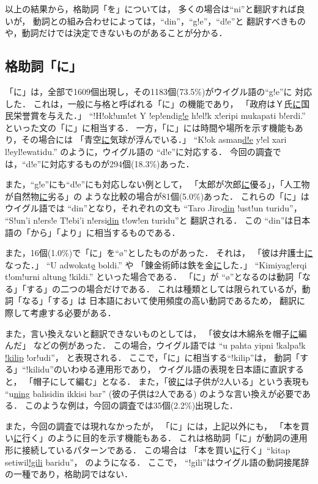 以上の結果から，格助詞「を」については，
多くの場合は``ni''と翻訳すれば良いが，
動詞との組み合わせによっては，``din''，``g!e''，``d!e''と
翻訳すべきものや，動詞だけでは決定できないものがあることが分かる．

\subsection{格助詞「に」}
\label{sec:ni}
「に」は，全部で1609個出現し，その1183個(73.5\%)がウイグル語の``g!e''に
対応した．
これは，一般に与格と呼ばれる「に」の機能であり，
「政府はＹ氏\underline{に}国民栄誉賞を与えた．」
``!H!ok!um!et Y !ep!endi\underline{g!e} h!el!k x!eripi mukapati b!erdi.''
といった文の「に」に相当する．
一方，「に」には時間や場所を示す機能もあり，その場合には
「青空\underline{に}気球が浮んでいる．」
``K!ok asman\underline{d!e} y!el xari l!eyl!ewatidu.''
のように，ウイグル語の ``d!e''に対応する．
今回の調査では，``d!e''に対応するものが294個(18.3\%)あった．

また，``g!e''にも``d!e''にも対応しない例として，
「太郎が次郎\underline{に}優る」，「人工物が自然物\underline{に}劣る」の
ような比較の場合が81個(5.0\%)あった．
これらの「に」はウイグル語では ``din''となり，それぞれの文も
``Taro Jiro\underline{din} !ust!un turidu''，
``S!un'i n!ers!e T!ebi'i n!ersi\underline{din} t!ow!en turidu''と
翻訳される．
この ``din''は日本語の「から」「より」に相当するものである．

また，16個(1.0\%)で「に」を``\o''としたものがあった．
それは，
「彼は弁護士\underline{に}なった．」
``U  adwokat\underline{\o} boldi.''
や
「錬金術師は鉄を金\underline{に}した．」
``Kimiyag!erqi t!om!urni altun\underline{\o} !kildi.''
といった場合である．
「に」が ``\o''となるのは動詞「なる」「する」の二つの場合だけである．
これは種類としては限られているが，動詞「なる」「する」は
日本語において使用頻度の高い動詞であるため，
翻訳に際して考慮する必要がある．

また，言い換えないと翻訳できないものとしては，
「彼女は木綿糸を帽子\underline{に}編んだ」
などの例があった．
この場合，ウイグル語では
``u pahta yipni !kalpa!k \underline{!kilip} !or!udi''，
と表現される．
ここで，「に」に相当する``!kilip''は，
動詞「する」``!kilidu''のいわゆる連用形であり，
ウイグル語の表現を日本語に直訳すると，
「帽子にして編む」となる．
また，「彼\underline{に}は子供が2人いる」という表現も
``u\underline{ning} balisidin ikkisi bar''
(彼の子供は2人である)
のような言い換えが必要である．
このような例は，今回の調査では35個(2.2\%)出現した．

また，今回の調査では現れなかったが，
「に」には，上記以外にも，
「本を買い\underline{に}行く」のように目的を示す機能もある．
これは格助詞「に」が動詞の連用形に接続しているパターンである．
この場合は
「本を買い\underline{に}行く」``kitap setiwil\underline{!gili} baridu''，
のようになる．
ここで， ``!gili''はウイグル語の動詞接尾辞の一種であり，格助詞ではない．

